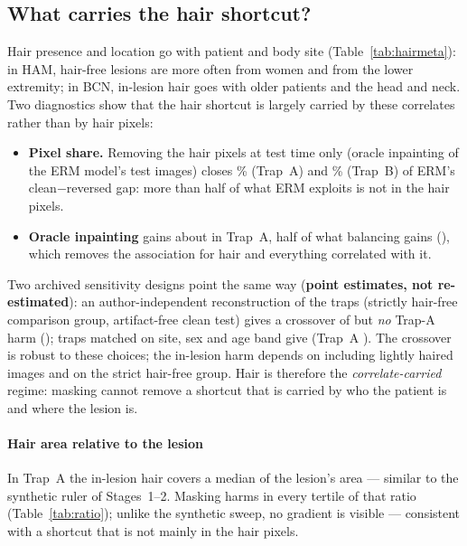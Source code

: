 \subsection{What carries the hair shortcut?}
Hair presence and location go with patient and body site (Table~\ref{tab:hairmeta}): in HAM, hair-free lesions are
more often from women and from the lower extremity; in BCN, in-lesion hair goes with older patients and the head and
neck. Two diagnostics show that the hair shortcut is largely carried by these correlates rather than by hair pixels:
\begin{itemize}[leftmargin=*]\itemsep1pt
\item \textbf{Pixel share.} Removing the hair pixels at test time only (oracle inpainting of the ERM model's test
images) closes \sThreePixShareA\% (Trap~A) and \sThreePixShareB\% (Trap~B) of ERM's clean$-$reversed gap: more than
half of what ERM exploits is not in the hair pixels.
\item \textbf{Oracle inpainting} gains about \sThreeArmADermoscopyinpaint{} in Trap~A, half of what balancing gains
(\sThreeArmADermoscopybalanced), which removes the association for hair and everything correlated with it.
\end{itemize}
Two archived sensitivity designs point the same way (\textbf{point estimates, not re-estimated}): an
author-independent reconstruction of the traps (strictly hair-free comparison group, artifact-free clean test) gives a
crossover of \sThreeHdreconcrossover{} but \emph{no} Trap-A harm (\sThreeHdreconmaskminusermtrapA); traps matched on site,
sex and age band give \sThreeHdmetamatchedcrossover{} (Trap~A \sThreeHdmetamatchedmaskminusermtrapA). The crossover is
robust to these choices; the in-lesion harm depends on including lightly haired images and on the strict hair-free
group. Hair is therefore the \emph{correlate-carried} regime: masking cannot remove a shortcut that is carried by who
the patient is and where the lesion is.


\paragraph{Hair area relative to the lesion} In Trap~A the in-lesion hair covers a median \sThreeHairRatioMedian{} of
the lesion's area --- similar to the synthetic ruler of Stages~1--2. Masking harms in every tertile of that ratio
(Table~\ref{tab:ratio}); unlike the synthetic sweep, no gradient is visible --- consistent with a shortcut that is not
mainly in the hair pixels.


